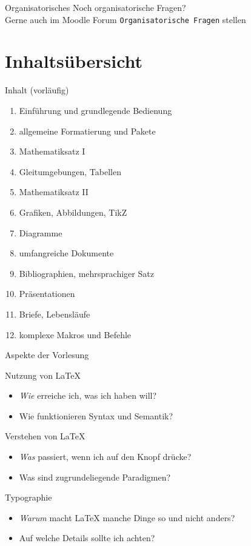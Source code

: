 \documentclass[
	vorläufig=false,
	datum=2021-10-20,
	titel={Einführung und grundlegende Bedienung},
	web=true,
	max,
	aspectratio=1610,
]{../tex/latexkurs-slides}
\begin{document}
\begin{frame}[t]{Organisatorisches}
    \vspace{5em}
    \centering \Huge Noch organisatorische Fragen?\\
    \vspace{2em}
    \centering \normalsize Gerne auch im Moodle Forum \texttt{Organisatorische Fragen} stellen
\end{frame}



\section{Inhaltsübersicht}

\begin{frame}{Inhalt (vorläufig)}
	\begin{enumerate}
		\item Einführung und grundlegende Bedienung
		\item allgemeine Formatierung und Pakete
		\item Mathematiksatz I
		\item Gleitumgebungen, Tabellen
		\item Mathematiksatz II
		\item Grafiken, Abbildungen, TikZ
		\item Diagramme
		\item umfangreiche Dokumente
		\item Bibliographien, mehrsprachiger Satz
		\item Präsentationen
		\item Briefe, Lebensläufe
		\item komplexe Makros und Befehle
	\end{enumerate}
\end{frame}

\begin{frame}{Aspekte der Vorlesung}
	\begin{block}{Nutzung von \LaTeX{}}
		\begin{itemize}
			\item \emph{Wie} erreiche ich, was ich haben will?
			\item Wie funktionieren Syntax und Semantik?
		\end{itemize}
	\end{block}
	\begin{block}{Verstehen von \LaTeX{}}
		\begin{itemize}
			\item \emph{Was} passiert, wenn ich auf den Knopf drücke?
			\item Was sind zugrundeliegende Paradigmen?
		\end{itemize}
	\end{block}
	\begin{block}{Typographie}
		\begin{itemize}
			\item \emph{Warum} macht \LaTeX{} manche Dinge so und nicht anders?
			\item Auf welche Details sollte ich achten?
		\end{itemize}
	\end{block}
\end{frame}	
\end{document}
